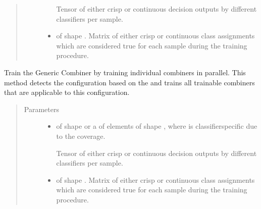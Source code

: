 \documentclass[letterpaper,10pt,english]{sphinxmanual}
\begin{document}
\begin{fulllineitems}
\begin{fulllineitems}
\begin{quote}
\begin{description}
\begin{itemize}
\sphinxAtStartPar
Tensor of either crisp or continuous decision outputs by different classifiers per sample.


\item {} 
\sphinxAtStartPar
{} \textendash{}  of shape .
Matrix of either crisp or continuous class assignments which are considered true for each sample during
the training procedure.

\end{itemize}

\end{description}\end{quote}

\end{fulllineitems}


\begin{fulllineitems}
\label{\detokenize{pusion.auto.generic_combiner:pusion.auto.generic_combiner.GenericCombiner.train_par}}
\sphinxAtStartPar
Train the Generic Combiner by training individual combiners in parallel.
This method detects the configuration based on the  and trains all trainable combiners
that are applicable to this configuration.
\begin{quote}\begin{description}
\item[{Parameters}] \leavevmode\begin{itemize}
\item {} 
\sphinxAtStartPar
{} \textendash{} 
\sphinxAtStartPar
{} of shape  or a  of
 elements of shape , where  is classifier\sphinxhyphen{}specific
due to the coverage.

\sphinxAtStartPar
Tensor of either crisp or continuous decision outputs by different classifiers per sample.


\item {} 
\sphinxAtStartPar
{} \textendash{}  of shape .
Matrix of either crisp or continuous class assignments which are considered true for each sample during
the training procedure.


\end{itemize}
\end{description}
\end{quote}
\end{fulllineitems}
\end{fulllineitems}
\end{document}
